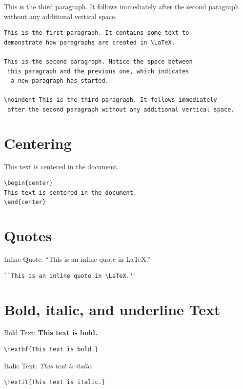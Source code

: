 \documentclass[12pt]{article}
\begin{document}
\noindent This is the third paragraph. It follows immediately 
after the second paragraph without any additional vertical space.

\begin{verbatim}
This is the first paragraph. It contains some text to 
demonstrate how paragraphs are created in \LaTeX.

This is the second paragraph. Notice the space between
 this paragraph and the previous one, which indicates
  a new paragraph has started.

\noindent This is the third paragraph. It follows immediately
 after the second paragraph without any additional vertical space.
\end{verbatim}


\section{Centering}
\begin{center}
This text is centered in the document.
\end{center}

\begin{verbatim}
\begin{center}
This text is centered in the document.
\end{center}
\end{verbatim}



\section{Quotes}

Inline Quote: ``This is an inline quote in \LaTeX.''

\begin{verbatim}
``This is an inline quote in \LaTeX.''
\end{verbatim}


\section{Bold, italic, and underline Text}

Bold Text: \textbf{This text is bold.}
\begin{verbatim}
\textbf{This text is bold.}
\end{verbatim}

Italic Text: \textit{This text is italic.}
\begin{verbatim}
\textit{This text is italic.}
\end{verbatim}
\end{document}
